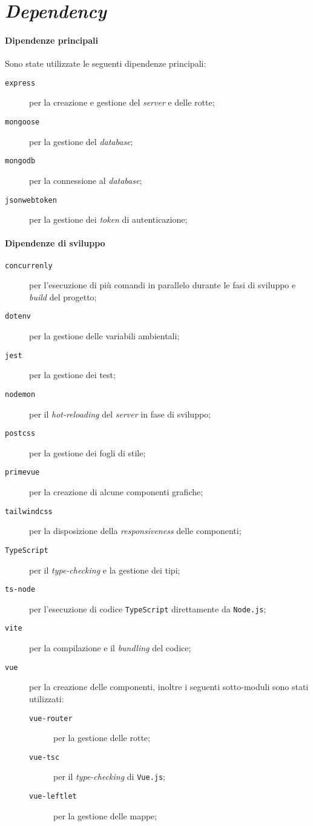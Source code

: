 \section{\textit{Dependency}}
    \paragraph{Dipendenze principali} Sono state utilizzate le seguenti dipendenze principali:
    \begin{description}
        \item[\texttt{express}] per la creazione e gestione del \textit{server} e delle rotte;
        \item[\texttt{mongoose}] per la gestione del \textit{database};
        \item[\texttt{mongodb}] per la connessione al \textit{database};
        \item[\texttt{jsonwebtoken}] per la gestione dei \textit{token} di autenticazione;
    \end{description}
    \paragraph{Dipendenze di sviluppo}
    \begin{description}
        \item[\texttt{concurrenly}] per l'esecuzione di più comandi in parallelo durante le fasi di sviluppo e \textit{build} del progetto;
        \item[\texttt{dotenv}] per la gestione delle variabili ambientali;
        \item[\texttt{jest}] per la gestione dei test;
        \item[\texttt{nodemon}] per il \textit{hot-reloading} del \textit{server} in fase di sviluppo;
        \item[\texttt{postcss}] per la gestione dei fogli di stile;
        \item[\texttt{primevue}] per la creazione di alcune componenti grafiche;
        \item[\texttt{tailwindcss}] per la disposizione della \textit{responsiveness} delle componenti;
        \item[\texttt{TypeScript}] per il \textit{type-checking} e la gestione dei tipi;
        \item[\texttt{ts-node}] per l'esecuzione di codice \texttt{TypeScript} direttamente da \texttt{Node.js};
        \item[\texttt{vite}] per la compilazione e il \textit{bundling} del codice;
        \item[\texttt{vue}] per la creazione delle componenti, inoltre i seguenti sotto-moduli sono stati utilizzati:
            \begin{description}
                \item[\texttt{vue-router}] per la gestione delle rotte;
                \item[\texttt{vue-tsc}] per il \textit{type-checking} di \texttt{Vue.js};
                \item[\texttt{vue-leftlet}] per la gestione delle mappe;
            \end{description}
    \end{description}
